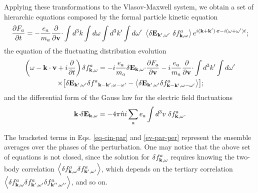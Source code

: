 \documentclass[12pt,a4paper,ruledheader]{report}
\begin{document}
Applying these transformations to the Vlasov-Maxwell system, we
obtain a set of hierarchic equations composed by the formal
particle kinetic equation \cite{Yoon00}
\begin{equation}
\frac{\partial F_a}{\partial t}=-\frac{e_a}{m_a}\frac{\partial}{\partial {\bf v}}
{\bf \cdot}\int d^3k \int d\omega \int d^3k'\int d\omega '\
\left<\delta{\bf E}_{{\bf k'},\omega '}\ \delta f^a_{{\bf k},\omega}\right>
e^{i({\bf k+k'}){\bf \cdot r}-i(\omega+\omega ')t};
\label{eq-cin-par}
\end{equation}
the equation of the fluctuating distribution evolution
\begin{equation}
\begin{split}
  \left(\omega-{\bf k \cdot v}
    +i\frac{\partial}{\partial t}\right)\delta f^a_{{\bf k},\omega}
  &=-i \frac{e_a}{m_a} \delta {\bf E}_{{\bf k},\omega}{\bf \cdot}
  \frac{\partial F_a}{\partial \bf v}
  -i\frac{e_a}{m_a}\frac{\partial}{\partial \bf v}
  {\bf \cdot} \int d^3k' \int d\omega '\\
  \times \bigr[\delta {\bf E}_{{\bf k'},\omega '}
  \delta f^a&_{{\bf k-k'},\omega-\omega '}
    -\left<\delta {\bf E}_{{\bf k'},\omega '}
    \delta f^a_{{\bf k-k'},\omega-\omega '}\right>\bigr];
\end{split}
\label{ev-par-per}
\end{equation}
and the differential form of the Gauss law for the electric field fluctuations
\begin{equation}
   {\bf k \cdot}\delta{\bf E}_{{\bf k},\omega}=-4\pi \hat n i
   \sum_a e_a\int d^3v\ \delta f^a_{{\bf k}, \omega}.
\label{poisson-flut}
\end{equation}

The bracketed terms in Eqs. \eqref{eq-cin-par} and \eqref{ev-par-per}
represent the ensemble averages over the phases of the perturbation. One
may notice that the above set of equations is not closed, since the solution
for $\delta f^a_{{\bf k},\omega}$ requires knowing the two-body correlation
$\left<\delta f^a_{{\bf k},\omega}\delta f^a_{{\bf k'},\omega '}\right>$,
which depends on the tertiary correlation $\left<\delta f^a_{{\bf k},\omega}
  \delta f^a_{{\bf k'},\omega '}\delta f^a_{{\bf k''},\omega ''}\right>$, and
so on.
\end{document}
